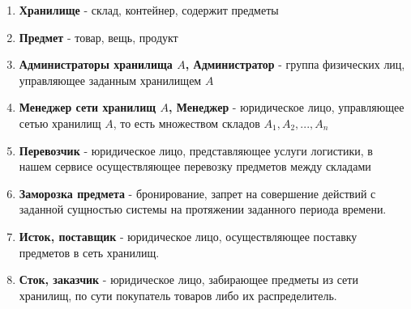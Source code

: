 \begin{enumerate}
  \item \textbf{Хранилище} - склад, контейнер, содержит предметы

  \item \textbf{Предмет} - товар, вещь, продукт

  \item \textbf{Администраторы хранилища $A$, Администратор} - группа физических
        лиц, управляющее заданным хранилищем $A$

  \item \textbf{Менеджер сети хранилищ $A$, Менеджер} - юридическое лицо,
        управляющее сетью хранилищ $A$, то есть множеством
        складов $A_1, A_2, ..., A_n$

  \item \textbf{Перевозчик} - юридическое лицо, представляющее
        услуги логистики, в нашем сервисе осуществляющее перевозку
        предметов между складами

  \item \textbf{Заморозка предмета} - бронирование, запрет на 
        совершение действий с заданной сущностью системы на
        протяжении заданного периода времени.

  \item \textbf{Исток, поставщик} - юридическое лицо, 
        осуществляющее поставку предметов в сеть хранилищ.

  \item \textbf{Сток, заказчик} - юридическое лицо,
        забирающее предметы из сети хранилищ, по сути покупатель
        товаров либо их распределитель.
\end{enumerate}